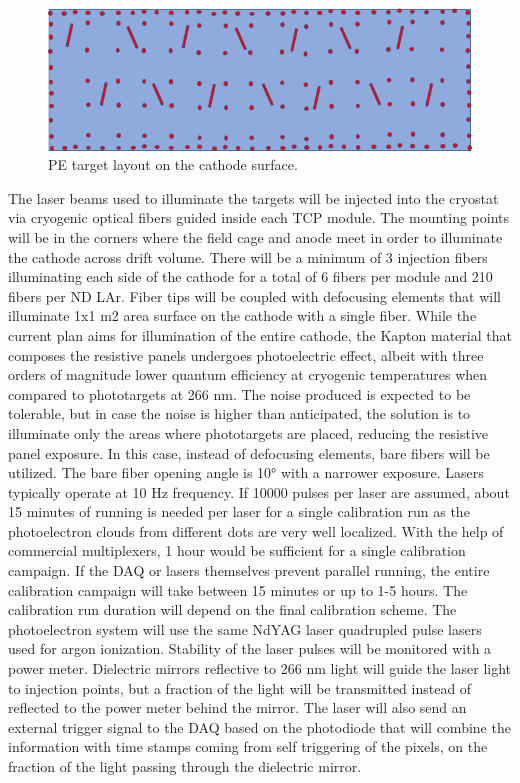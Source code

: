 \begin{figure}[htbp]
\centering 
\includegraphics[width=0.47\linewidth]{graphics/lartpc/Calibration/PhototargetsCathode.png}
\caption{\label{fig:target_layout} PE target layout on the cathode surface.}
\end{figure}

 The laser beams used to illuminate the targets will be injected into the cryostat via cryogenic optical fibers guided inside each TCP module. The mounting points will be in the corners where the field cage and anode meet in order to illuminate the cathode across drift volume. There will be a minimum of 3 injection fibers illuminating each side of the cathode for a total of  6 fibers per module and 210 fibers per ND LAr. Fiber tips  will be coupled with defocusing elements that will illuminate 1x1 m2  area surface on the cathode with a single fiber. 
While the current plan aims for illumination of the entire cathode, the Kapton material that composes the resistive panels undergoes photoelectric effect, albeit with three orders of magnitude lower quantum efficiency at cryogenic temperatures when compared to phototargets at 266 nm. The noise produced is expected to be tolerable, but in case the noise is higher than anticipated, the solution is to illuminate only the areas where phototargets are placed, reducing the resistive panel exposure. In this case, instead of defocusing elements, bare fibers will be utilized. The bare fiber opening angle is 10° with a narrower exposure. Lasers typically operate at 10 Hz frequency. If 10000 pulses per laser are assumed, about 15 minutes of running is needed per laser for a single calibration run as the photoelectron clouds from different dots are very well localized. With the help of commercial multiplexers, 1 hour would be sufficient for a single calibration campaign. If the DAQ or lasers themselves prevent parallel running, the entire calibration campaign will take between 15 minutes or up to 1-5 hours. The calibration run duration will depend on the final calibration scheme. The photoelectron system will use the same NdYAG laser quadrupled pulse lasers used for argon ionization. Stability of the laser pulses will be monitored with a power meter. Dielectric mirrors reflective to 266 nm light will guide the laser light to injection points, but a fraction of the light will be transmitted instead of reflected to the power meter behind the mirror. The laser will also send an external trigger signal to the DAQ based on the photodiode that will combine the information with time stamps coming from self triggering of the pixels,  on the fraction of the light passing through the dielectric mirror.


